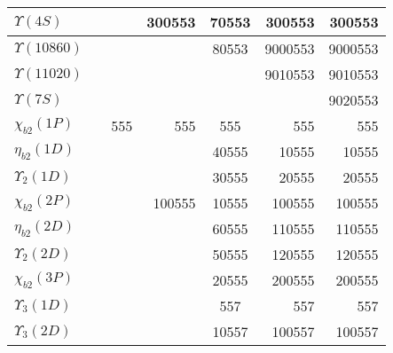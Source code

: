 \begin{tabular}{|l@{\tstrut}|r|r|r|c|r|r|}
$\Upsilon(4S)$                 &     &         & 300553 &  70553 &  300553 & 300553 \\ \hline
$\Upsilon(10860)$              &     &         &        & 80553 & 9000553 & 9000553 \\ \hline
$\Upsilon(11020)$              &     &         &        &  & 9010553 & 9010553 \\ \hline
$\Upsilon(7S)$                 &     &         &        &  &         & 9020553 \\ \hline\hline
$\chi_{b2}(1P)$                &     &   555   &    555 & 555 &     555 & 555 \\ \hline
$\eta_{b2}(1D)$                &     &         &        &  40555   &   10555 & 10555 \\ \hline
$\Upsilon_2(1D)$               &     &         &        &  30555   &   20555 & 20555 \\ \hline
$\chi_{b2}(2P)$                &     &         & 100555 & 10555 &  100555 & 100555 \\ \hline
$\eta_{b2}(2D)$                &     &         &        &  60555   &  110555 & 110555 \\ \hline
$\Upsilon_2(2D)$               &     &         &        &  50555   &  120555 & 120555 \\ \hline
$\chi_{b2}(3P)$                &     &         &        &  20555   &  200555 & 200555 \\ \hline\hline
$\Upsilon_3(1D)$               &     &         &        &  557   &     557 & 557 \\ \hline
$\Upsilon_3(2D)$               &     &         &        &  10557   &  100557 & 100557 \\ \hline
\end{tabular}

